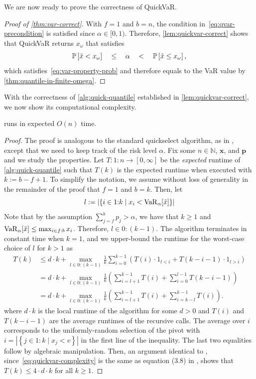 \documentclass[10pt]{article} %
\renewcommand{\cite}{\citep}
\begin{document}
We are now ready to prove the correctness of QuickVaR.
\begin{proof}[Proof of \cref{thm:var-correct}]
With $f = 1$ and $b = n$, the condition in~\eqref{eq:qvar-precondition} is satisfied since $\alpha\in [0,1)$. Therefore, \cref{lem:quickvar-correct} shows that QuickVaR returns $x_{\omega}$ that satisfies
  \[
  \P{\tilde{x} < x_{\omega}}
  \quad \le \quad
  \alpha 
  \quad < \quad \P{\tilde{x} \le x_{\omega}}, 
\]
which satisfies~\eqref{eq:var-property-prob} and therefore equals to the VaR value by 
  \cref{thm:quantile-in-finite-omega}. 
\end{proof}

With the correctness of \cref{alg:quick-quantile} established in \cref{lem:quickvar-correct}, we now show its computational complexity. 
\begin{theorem} \label{prop:time-complexity}
 runs in expected $O(n)$ time.
\end{theorem}
\begin{proof}
The proof is analogous to the standard quickselect algorithm, as in \citep[theorem~3.3]{horowitz1998computer}, except that we need to keep track of the risk level $\alpha$. Fix some $n \in \mathbb{N}$, $\bm{x}$, and $\bm{p}$ and we study the properties. Let $T\colon 1{:}n \to [0,\infty]$ be the \emph{expected} runtime of \cref{alg:quick-quantile} such that $T(k)$ is the expected runtime when executed with $k := b - f + 1$. To simplify the notation, we assume without loss of generality in the remainder of the proof that $f = 1$ and $b = k$. Then, let
\[
  l := \left| \left\{ i \in 1{:}k \mid  x_i < \varo_{\alpha}[\tilde{x}]\right\}   \right|
\]
Note that by the assumption $\sum_{j = f}^b p_j > \alpha$, we have that $k \ge 1$ and $\varo_{\alpha}[\tilde{x}] \le \max_{i\in f{:}b} x_i$. Therefore, $l \in 0{:}(k-1)$. The algorithm terminates in constant time when $k = 1$, and we upper-bound the runtime for the worst-case choice of $l$ for $k > 1$ as
\begin{align}
\nonumber
  T(k)
  &\le d\cdot k + \max_{l\in 0{:}(k-1)} \frac{1}{k} \sum_{i=0}^{k-1} \left(   T(i) \cdot 1_{l < i} + T(k - i - 1) \cdot 1_{l > i}  \right) \\
\nonumber
  &= d\cdot k + \max_{l\in 0{:}(k-1)} \frac{1}{k}  \left(  \sum_{i=l+1}^{k-1} T(i)  + \sum_{i=0}^{l-1} T(k - i - 1)   \right) \\
\label{eq:quickvar-complexity}
  &= d\cdot k + \max_{l\in 0{:}(k-1)} \frac{1}{k}  \left(  \sum_{i=l+1}^{k-1} T(i)  + \sum_{i=k-l}^{k-1} T(i)   \right).
\end{align}
where $d\cdot k$ is the local runtime of the algorithm for some $d > 0$ and $T(i)$ and $T(k - i - 1)$ are the average runtimes of the recursive calls. The average over $i$ corresponds to the uniformly-random selection of the pivot with $i = \left| \left\{ j \in 1{:}k \mid x_j < v \right\} \right|$ in the first line of the inequality. The last two equalities follow by algebraic manipulation. Then, an argument identical to \cite[theorem~3.3]{horowitz1998computer}, since~\eqref{eq:quickvar-complexity} is the same as equation (3.8) in \cite{horowitz1998computer}, shows that \(T(k)\le 4\cdot d\cdot k\) for all \(k\ge 1\).
\end{proof}
\end{document}
